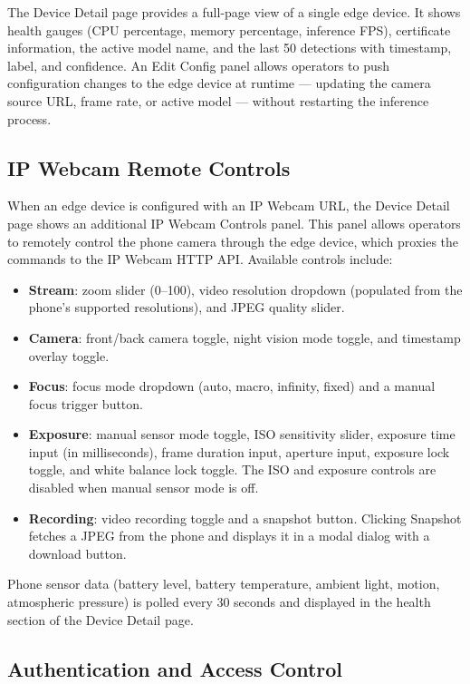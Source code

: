 \documentclass[12pt,a4paper]{report}
\begin{document}
The Device Detail page provides a full-page view of a single edge device.
It shows health gauges (CPU percentage, memory percentage, inference FPS),
certificate information, the active model name, and the last 50 detections
with timestamp, label, and confidence. An Edit Config panel allows operators
to push configuration changes to the edge device at runtime --- updating the
camera source URL, frame rate, or active model --- without restarting the
inference process.

\subsection{IP Webcam Remote Controls}

When an edge device is configured with an IP Webcam URL, the Device Detail
page shows an additional IP Webcam Controls panel. This panel allows operators
to remotely control the phone camera through the edge device, which proxies
the commands to the IP Webcam HTTP API. Available controls include:

\begin{itemize}
  \item \textbf{Stream}: zoom slider (0--100), video resolution dropdown
        (populated from the phone's supported resolutions), and JPEG quality
        slider.
  \item \textbf{Camera}: front/back camera toggle, night vision mode
        toggle, and timestamp overlay toggle.
  \item \textbf{Focus}: focus mode dropdown (auto, macro, infinity, fixed)
        and a manual focus trigger button.
  \item \textbf{Exposure}: manual sensor mode toggle, ISO sensitivity slider,
        exposure time input (in milliseconds), frame duration input, aperture
        input, exposure lock toggle, and white balance lock toggle. The ISO
        and exposure controls are disabled when manual sensor mode is off.
  \item \textbf{Recording}: video recording toggle and a snapshot button.
        Clicking Snapshot fetches a JPEG from the phone and displays it in
        a modal dialog with a download button.
\end{itemize}

Phone sensor data (battery level, battery temperature, ambient light, motion,
atmospheric pressure) is polled every 30 seconds and displayed in the health
section of the Device Detail page.

\subsection{Authentication and Access Control}
\end{document}
